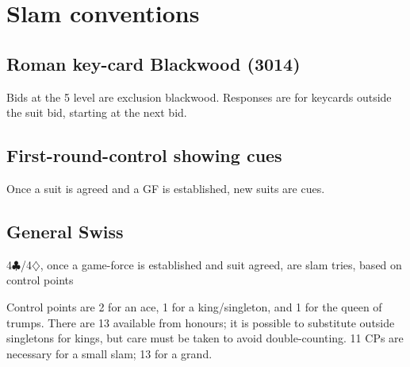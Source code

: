 \documentclass[a4paper,12pt]{article}
\begin{document}
\section{Slam conventions}

\subsection{Roman key-card Blackwood (3014)}

Bids at the 5 level are exclusion blackwood. Responses are for keycards outside
the suit bid, starting at the next bid.

\subsection{First-round-control showing cues}

Once a suit is agreed and a GF is established, new suits are cues.

\subsection{General Swiss}

4$\clubsuit$/4$\diamondsuit$, once a game-force is established and suit agreed, are slam tries, based
on control points

Control points are 2 for an ace, 1 for a king/singleton, and 1 for the queen of
trumps.  There are 13 available from honours; it is possible to substitute
outside singletons for kings, but care must be taken to avoid double-counting.
11 CPs are necessary for a small slam; 13 for a grand.
\end{document}
